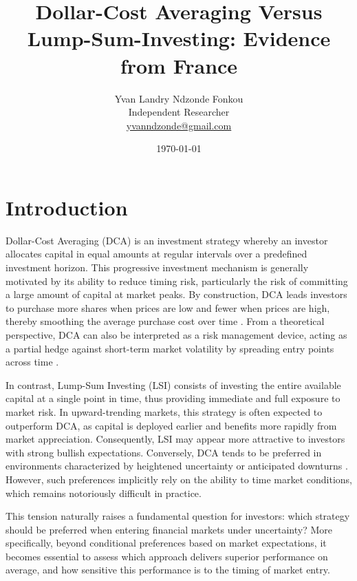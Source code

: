 \documentclass[11pt,a4paper]{article}
\title{%
  \vspace{-0.5cm}
  {\large\bfseries
    Dollar-Cost Averaging Versus Lump-Sum-Investing: Evidence from France }
}
\author{%
  Yvan Landry Ndzonde Fonkou\\[2pt]
  \small Independent Researcher\\
  \small \href{mailto:yvanndzonde@gmail.com}{yvanndzonde@gmail.com}
}
\date{\small\monthyear\today}
\begin{document}
\maketitle
\thispagestyle{fancy}
\vspace{-4pt}

\begin{abstract}
\end{abstract}

\section{Introduction}
\label{sec:intro}
Dollar-Cost Averaging (DCA) is an investment strategy whereby an investor allocates capital in equal amounts at regular intervals over a predefined investment horizon. This progressive investment mechanism is generally motivated by its ability to reduce timing risk, particularly the risk of committing a large amount of capital at market peaks. By construction, DCA leads investors to purchase more shares when prices are low and fewer when prices are high, thereby smoothing the average purchase cost over time \citep{dichtl2011}. From a theoretical perspective, DCA can also be interpreted as a risk management device, acting as a partial hedge against short-term market volatility by spreading entry points across time \citep{milevsky2003}.

In contrast, Lump-Sum Investing (LSI) consists of investing the entire available capital at a single point in time, thus providing immediate and full exposure to market risk. In upward-trending markets, this strategy is often expected to outperform DCA, as capital is deployed earlier and benefits more rapidly from market appreciation. Consequently, LSI may appear more attractive to investors with strong bullish expectations. Conversely, DCA tends to be preferred in environments characterized by heightened uncertainty or anticipated downturns \citep{grable2015}. However, such preferences implicitly rely on the ability to time market conditions, which remains notoriously difficult in practice.

This tension naturally raises a fundamental question for investors: which strategy should be preferred when entering financial markets under uncertainty? More specifically, beyond conditional preferences based on market expectations, it becomes essential to assess which approach delivers superior performance on average, and how sensitive this performance is to the timing of market entry.
\end{document}
